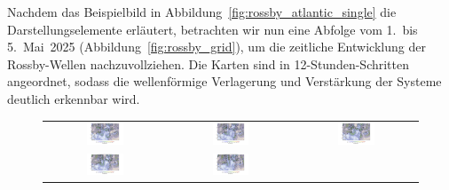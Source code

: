 Nachdem das Beispielbild in Abbildung~\ref{fig:rossby_atlantic_single} die
Darstellungselemente erläutert, betrachten wir nun eine Abfolge vom 1.\ bis 5.\ Mai~2025
(Abbildung~\ref{fig:rossby_grid}), um die zeitliche Entwicklung der Rossby-Wellen
nachzuvollziehen. Die Karten sind in 12-Stunden-Schritten angeordnet, sodass die
wellenförmige Verlagerung und Verstärkung der Systeme deutlich erkennbar wird.


\begin{figure}
	\centering
	\renewcommand{\arraystretch}{0.5}
	\begin{tabular}{ccc}
		\includegraphics[width=0.32\textwidth, trim=3.1cm 3cm 3cm 0.8cm, clip]{papers/rossby/images/data_2025_5_1_00_00_500.jpg} &
		\includegraphics[width=0.32\textwidth, trim=3.1cm 3cm 3cm 0.8cm, clip]{papers/rossby/images/data_2025_5_1_12_00_500.jpg} &
		\includegraphics[width=0.32\textwidth, trim=3.1cm 3cm 3cm 0.8cm, clip]{papers/rossby/images/data_2025_5_2_00_00_500.jpg}   \\
		\includegraphics[width=0.32\textwidth, trim=3.1cm 3cm 3cm 0.8cm, clip]{papers/rossby/images/data_2025_5_2_12_00_500.jpg} &
		\includegraphics[width=0.32\textwidth, trim=3.1cm 3cm 3cm 0.8cm, clip]{papers/rossby/images/data_2025_5_3_00_00_500.jpg} &

\end{tabular}
\end{figure}
